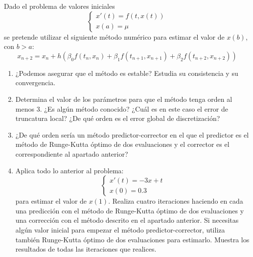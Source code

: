 \begin{ejercicio}
    Dado el problema de valores iniciales
    \begin{equation*}
        \begin{cases}
            x'(t) = f(t, x(t)) \\
            x(a) = \mu
        \end{cases}
    \end{equation*}
    se pretende utilizar el siguiente método numérico para estimar el valor de $x(b)$, con $b > a$:
    \begin{equation*}
        x_{n+2} = x_n + h \left( \beta_0 f(t_n, x_n) + \beta_1 f(t_{n+1}, x_{n+1}) + \beta_2 f(t_{n+2}, x_{n+2}) \right)
    \end{equation*}
    \begin{enumerate}
        \item ¿Podemos asegurar que el método es estable? Estudia su consistencia y su convergencia.
        \item Determina el valor de los parámetros para que el método tenga orden al menos 3. ¿Es algún método conocido? ¿Cuál es en este caso el error de truncatura local? ¿De qué orden es el error global de discretización?
        \item ¿De qué orden sería un método predictor-corrector en el que el predictor es el método de Runge-Kutta óptimo de dos evaluaciones y el corrector es el correspondiente al apartado anterior?
        \item Aplica todo lo anterior al problema:
            \begin{equation*}
                \begin{cases}
                    x'(t) = -3x + t \\
                    x(0) = 0.3
                \end{cases}
            \end{equation*}
            para estimar el valor de $x(1)$. Realiza cuatro iteraciones haciendo en cada una predicción con el método de Runge-Kutta óptimo de dos evaluaciones y una corrección con el método descrito en el apartado anterior. Si necesitas algún valor inicial para empezar el método predictor-corrector, utiliza también Runge-Kutta óptimo de dos evaluaciones para estimarlo. Muestra los resultados de todas las iteraciones que realices.
    \end{enumerate}
\end{ejercicio}

